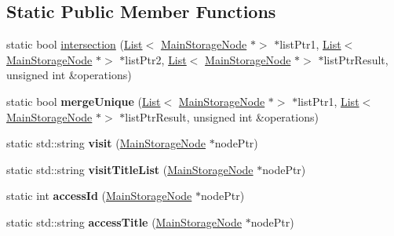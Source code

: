 \subsection*{Static Public Member Functions}
\begin{DoxyCompactItemize}
\item 
static bool \hyperlink{class_main_storage_abb808b8d737244bae19a33ae3888a1d3}{intersection} (\hyperlink{class_list}{List}$<$ \hyperlink{class_main_storage_node}{Main\+Storage\+Node} $\ast$$>$ $\ast$list\+Ptr1, \hyperlink{class_list}{List}$<$ \hyperlink{class_main_storage_node}{Main\+Storage\+Node} $\ast$$>$ $\ast$list\+Ptr2, \hyperlink{class_list}{List}$<$ \hyperlink{class_main_storage_node}{Main\+Storage\+Node} $\ast$$>$ $\ast$list\+Ptr\+Result, unsigned int \&operations)
\item 
\mbox{\label{class_main_storage_a3c84c770b91d69bbb6bf749af8f16214}} 
static bool {\bfseries merge\+Unique} (\hyperlink{class_list}{List}$<$ \hyperlink{class_main_storage_node}{Main\+Storage\+Node} $\ast$$>$ $\ast$list\+Ptr1, \hyperlink{class_list}{List}$<$ \hyperlink{class_main_storage_node}{Main\+Storage\+Node} $\ast$$>$ $\ast$list\+Ptr\+Result, unsigned int \&operations)
\item 
\mbox{\label{class_main_storage_af0bbc44a648395b758a8f8664d7b1fa6}} 
static std\+::string {\bfseries visit} (\hyperlink{class_main_storage_node}{Main\+Storage\+Node} $\ast$node\+Ptr)
\item 
\mbox{\label{class_main_storage_a89af5f69466d12a2b1f8dbe47d07f91f}} 
static std\+::string {\bfseries visit\+Title\+List} (\hyperlink{class_main_storage_node}{Main\+Storage\+Node} $\ast$node\+Ptr)
\item 
\mbox{\label{class_main_storage_ad70c5fd282fdc154ae65545392e6d368}} 
static int {\bfseries access\+Id} (\hyperlink{class_main_storage_node}{Main\+Storage\+Node} $\ast$node\+Ptr)
\item 
\mbox{\label{class_main_storage_aa864d7de5a16b0a7a672dc42e0829af7}} 
static std\+::string {\bfseries access\+Title} (\hyperlink{class_main_storage_node}{Main\+Storage\+Node} $\ast$node\+Ptr)
\item 
\mbox{\label{class_main_storage_a9415bd5f29e5610ee7c36377028b68b7}} 
$$
\end{DoxyCompactItemize}

